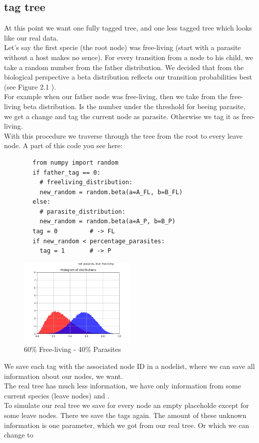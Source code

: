     \subsection{tag tree}
      At this point we want one fully tagged tree, and one less tagged tree which looks like our real 
        data.\\
      Let's say the first specie (the root node) was free-living (start with a parasite without a host 
        makes no sence). For every transition from a node to his child, we take a random number from
        the father distribution. We decided that from the biological perspective a beta distribution
        reflects our transition probabilities best (see Figure 2.1 ). \\
        For example when our father node was free-living, then we take from the free-living beta
        distribution. Is the number under the threshold for beeing parasite, we get a change and tag
        the current node as parasite. Otherwise we tag it as free-living. \\
        With this procedure we traverse through the tree from the root to every leave node. A part of
        this code you see here:
      \begin{lstlisting}
        from numpy import random
        if father_tag == 0:
          # freeliving_distribution:
          new_random = random.beta(a=A_FL, b=B_FL)
        else:
          # parasite_distribution:
          new_random = random.beta(a=A_P, b=B_P)
        tag = 0         # -> FL
        if new_random < percentage_parasites:
          tag = 1       # -> P
      \end{lstlisting}
      \begin{figure}
        \caption{60\% Free-living - 40\% Parasites}
        \centering
          \includegraphics[width=0.5\textwidth]{Figures/40-60.png}
      \end{figure}
      We save each tag with the associated node ID in a nodelist, where we can save all information
        about our nodes, we want. \\
      The real tree has much less information, we have only information from some current species 
        (leave nodes) and . \\
      To simulate our real tree we save for every node an empty placeholde except for some leave nodes.
      There we save the tags again. The amount of these unknown information is one parameter, which we
      got from our real tree. Or which we can change to 

